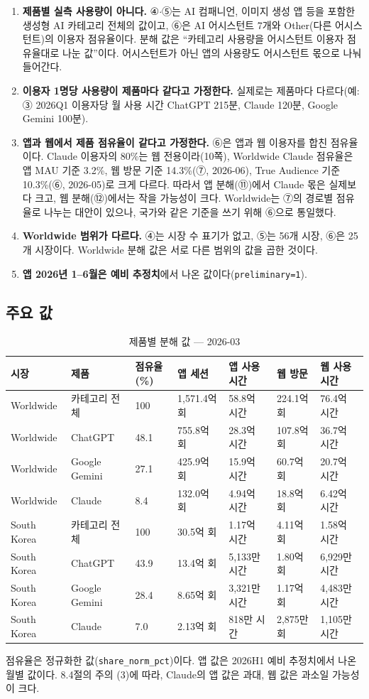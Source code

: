 \documentclass[11pt]{article}
\begin{document}
\begin{enumerate}[label=(\arabic*)]
  \item \textbf{제품별 실측 사용량이 아니다.} ④$\cdot$⑤는 AI 컴패니언, 이미지 생성 앱 등을 포함한 생성형 AI 카테고리 전체의 값이고, ⑥은 AI 어시스턴트 7개와 Other(다른 어시스턴트)의 이용자 점유율이다. 분해 값은 ``카테고리 사용량을 어시스턴트 이용자 점유율대로 나눈 값''이다. 어시스턴트가 아닌 앱의 사용량도 어시스턴트 몫으로 나눠 들어간다.
  \item \textbf{이용자 1명당 사용량이 제품마다 같다고 가정한다.} 실제로는 제품마다 다르다(예: ③ 2026Q1 이용자당 월 사용 시간 ChatGPT 215분, Claude 120분, Google Gemini 100분).
  \item \textbf{앱과 웹에서 제품 점유율이 같다고 가정한다.} ⑥은 앱과 웹 이용자를 합친 점유율이다. Claude 이용자의 80\%는 웹 전용이라(10쪽), Worldwide Claude 점유율은 앱 MAU 기준 3.2\%, 웹 방문 기준 14.3\%(⑦, 2026-06), True Audience 기준 10.3\%(⑥, 2026-05)로 크게 다르다. 따라서 앱 분해(⑪)에서 Claude 몫은 실제보다 크고, 웹 분해(⑫)에서는 작을 가능성이 크다. Worldwide는 ⑦의 경로별 점유율로 나누는 대안이 있으나, 국가와 같은 기준을 쓰기 위해 ⑥으로 통일했다.
  \item \textbf{Worldwide 범위가 다르다.} ④는 시장 수 표기가 없고, ⑤는 56개 시장, ⑥은 25개 시장이다. Worldwide 분해 값은 서로 다른 범위의 값을 곱한 것이다.
  \item \textbf{앱 2026년 1--6월은 예비 추정치}에서 나온 값이다(\texttt{preliminary=1}).
\end{enumerate}

\subsection{주요 값}

\begin{longtable}{L{2.2cm}L{2.6cm}L{1.4cm}L{2.0cm}L{2.0cm}L{1.9cm}L{2.0cm}}
\caption{제품별 분해 값 --- 2026-03}\label{tab:decomp}\\
\toprule
시장 & 제품 & 점유율(\%) & 앱 세션 & 앱 사용 시간 & 웹 방문 & 웹 사용 시간 \\
\midrule
\endhead
Worldwide & 카테고리 전체 & 100 & 1,571.4억 회 & 58.8억 시간 & 224.1억 회 & 76.4억 시간 \\
Worldwide & ChatGPT & 48.1 & 755.8억 회 & 28.3억 시간 & 107.8억 회 & 36.7억 시간 \\
Worldwide & Google Gemini & 27.1 & 425.9억 회 & 15.9억 시간 & 60.7억 회 & 20.7억 시간 \\
Worldwide & Claude & 8.4 & 132.0억 회 & 4.94억 시간 & 18.8억 회 & 6.42억 시간 \\
South Korea & 카테고리 전체 & 100 & 30.5억 회 & 1.17억 시간 & 4.11억 회 & 1.58억 시간 \\
South Korea & ChatGPT & 43.9 & 13.4억 회 & 5,133만 시간 & 1.80억 회 & 6,929만 시간 \\
South Korea & Google Gemini & 28.4 & 8.65억 회 & 3,321만 시간 & 1.17억 회 & 4,483만 시간 \\
South Korea & Claude & 7.0 & 2.13억 회 & 818만 시간 & 2,875만 회 & 1,105만 시간 \\
\bottomrule
\end{longtable}

점유율은 정규화한 값(\texttt{share\_norm\_pct})이다. 앱 값은 2026H1 예비 추정치에서 나온 월별 값이다. 8.4절의 주의 (3)에 따라, Claude의 앱 값은 과대, 웹 값은 과소일 가능성이 크다.

\printbibliography[title={참고문헌}]
\end{document}
